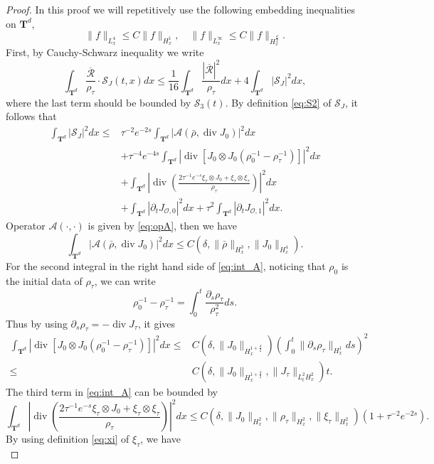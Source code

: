 \documentclass[english]{amsart}
\theoremstyle{plain}
\theoremstyle{definition}
\theoremstyle{remark}
\theoremstyle{plain}
\theoremstyle{plain}
\theoremstyle{plain}
\def\T{{\mathbf T}}%
\def\d{{\partial}}
\DeclareMathOperator{\diver}{div}
\numberwithin{equation}{section}
\begin{document}
\begin{proof}
In this proof we will repetitively use the following embedding inequalities on $\T^d$,
\[
\|f\|_{L^4_x}\leq C\|f\|_{H^1_x},\quad \|f\|_{L^\infty_x}\leq C\|f\|_{H^{\frac{d}{2}}_x}.
\]
First, by Cauchy-Schwarz inequality we write
\[
\int_{\T^d} \frac{\overline{\mathcal{R}}}{\rho_\tau}\cdot\mathcal{S}_J(t,x)dx\leq \frac{1}{16}\int_{\T^d} \frac{|\overline{\mathcal{R}}|^2}{\rho_\tau}dx+4\int_{\T^d} |\mathcal{S}_J|^2dx,
\]
where the last term should be bounded by $\mathcal{S}_3(t)$. 
By definition \eqref{eq:S2} of $\mathcal{S}_J$, it follows that
\begin{equation}\label{eq:int_A}
\begin{aligned}
\int_{\T^d} |\mathcal{S}_J|^2dx\leq &  \tau^{-2}e^{-2s}\int_{\T^d} |\mathcal{A}(\bar\rho,\diver J_0)|^2 dx\\
&+\tau^{-4}e^{-4s}\int_{\T^d} |\diver[J_0\otimes J_0(\rho_0^{-1}-\rho_\tau^{-1})]|^2 dx\\
&+\int_{\T^d} \left|\diver\left(\frac{2\tau^{-1}e^{-s}\xi_\tau\otimes J_0+\xi_\tau\otimes \xi_\tau}{\rho_\tau}\right)\right|^2 dx\\
&+\int_{\T^d} |\d_tJ_{\mathcal{O},0}|^2dx+\tau^2\int_{\T^d} |\d_tJ_{\mathcal{O},1}|^2dx.
\end{aligned}
\end{equation}
Operator $\mathcal{A}(\cdot,\cdot)$ is given by \eqref{eq:opA}, then we have
\[
\int_{\T^d} |\mathcal{A}(\bar\rho,\diver J_0)|^2 dx\leq C(\delta,\|\bar\rho\|_{H^3_x},\|J_0\|_{H^4_x}).
\]
For the second integral in the right hand side of \eqref{eq:int_A}, noticing that $\rho_0$ is the initial data of $\rho_\tau$, we can write
\[
\rho_0^{-1}-\rho_\tau^{-1}=\int_0^t\frac{\d_s\rho_\tau}{\rho_\tau^2}ds.
\]
Thus by using $\d_s\rho_\tau=-\diver J_\tau$, it gives
\begin{align*}
\int_{\T^d} |\diver[J_0\otimes J_0(\rho_0^{-1}-\rho_\tau^{-1})]|^2 dx\leq & C(\delta,\|J_0\|_{H^{1+\frac{d}{2}}_x})\left(\int_0^t\|\d_s\rho_\tau\|_{H^1_x}ds\right)^2\\
\leq & C(\delta,\|J_0\|_{H^{1+\frac{d}{2}}_x},\|J_\tau\|_{L^2_tH^2_x})t.
\end{align*}
The third term in \eqref{eq:int_A} can be bounded by
\[
\int_{\T^d} \left|\diver\left(\frac{2\tau^{-1}e^{-s}\xi_\tau\otimes J_0+\xi_\tau\otimes \xi_\tau}{\rho_\tau}\right)\right|^2 dx\leq C(\delta,\|J_0\|_{H^2_x},\|\rho_\tau\|_{H^2_x},\|\xi_\tau\|_{H^2_x})(1+\tau^{-2}e^{-2s}).
\]
By using definition \eqref{eq:xi} of $\xi_\tau$, we have
\begin{equation}\label{eq:bd_xi}

\end{equation}
\end{proof}
\end{document}
